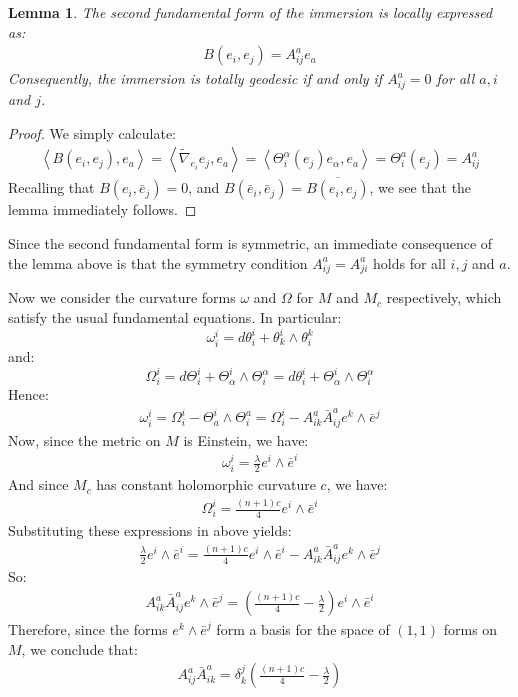 \documentclass[11pt]{amsart}
\newtheorem{lem}[subsection]{Lemma}
\def \la { \left\langle }
\def \ra { \right\rangle }
\def \nablaamb{ \tilde{\nabla} }
\theoremstyle{definition}
\begin{document}
\begin{lem} The second fundamental form of the immersion is locally expressed as:
%
\begin{align}
B( e_i, e_j ) = A^a_{ij} e_a
\end{align}
%
Consequently, the immersion is totally geodesic if and only if $A^a_{ij} = 0$ for all $a,i$ and $j$.
%
\end{lem}

\begin{proof} We simply calculate:
%
\begin{align*}
\la B(e_i, e_j), e_a \ra = \la \nablaamb_{e_i} e_j, e_a \ra = \la \Theta^{\alpha}_i (e_j) e_{\alpha}, e_a \ra = \Theta^a_i (e_j) = A^a_{ij}
\end{align*}
%
Recalling that $B(e_i, \bar{e}_j) = 0$, and $B(\bar{e}_i, \bar{e}_j ) = \overline{ B(e_i, e_j ) }$, we see that the lemma immediately follows.
%
\end{proof}

Since the second fundamental form is symmetric, an immediate consequence of the lemma above is that the symmetry condition $A^a_{ij} = A^a_{ji}$ holds for all $i,j$ and $a$.

Now we consider the curvature forms $\omega$ and $\Omega$ for $M$ and $M_c$ respectively, which satisfy the usual fundamental equations.  In particular:
%
$$\omega^i_i = d \theta^i_i + \theta^i_k \wedge \theta^k_i$$ 
%
and:
%
$$\Omega^i_i = d \Theta^i_i + \Theta^i_{\alpha} \wedge \Theta^{\alpha}_i = d \theta^i_i + \Theta^i_{\alpha} \wedge \Theta^{\alpha}_i$$
%
Hence:
%
\begin{align*}
\omega^i_i = \Omega^i_i - \Theta^i_a \wedge \Theta^a_i = \Omega^i_i - A^a_{ik} \bar{A}^a_{ij} e^k \wedge \bar{e}^j
\end{align*}
%
Now, since the metric on $M$ is Einstein, we have:
%
\begin{align*}
\omega^i_i = \frac{\lambda}{2} e^i \wedge \bar{e}^i
\end{align*}
%
And since $M_c$ has constant holomorphic curvature $c$, we have:
%
\begin{align*}
\Omega^i_i = \frac{(n+1)c}{4} e^i \wedge \bar{e}^i
\end{align*}
%
Substituting these expressions in above yields:
%
\begin{align*}
\frac{\lambda}{2} e^i \wedge \bar{e}^i = \frac{(n+1)c}{4} e^i \wedge \bar{e}^i - A^a_{ik} \bar{A}^a_{ij} e^k \wedge \bar{e}^j
\end{align*}
%
So:
%
\begin{align*}
A^a_{ik} \bar{A}^a_{ij} e^k \wedge \bar{e}^j = \left( \frac{(n+1)c}{4} - \frac{\lambda}{2} \right) e^i \wedge \bar{e}^i
\end{align*}
%
Therefore, since the forms $e^k \wedge \bar{e}^j$ form a basis for the space of $(1,1)$ forms on $M$, we conclude that:
%
\begin{align}
A^a_{ij} \bar{A}^a_{ik} = \delta^j_k \left( \frac{(n+1)c}{4} - \frac{\lambda}{2} \right)
\end{align}
\end{document}
